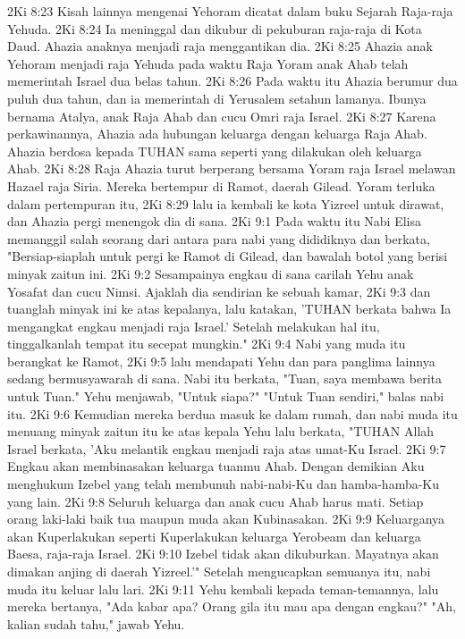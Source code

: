 2Ki 8:23  Kisah lainnya mengenai Yehoram dicatat dalam buku Sejarah Raja-raja Yehuda.
2Ki 8:24  Ia meninggal dan dikubur di pekuburan raja-raja di Kota Daud. Ahazia anaknya menjadi raja menggantikan dia.
2Ki 8:25  Ahazia anak Yehoram menjadi raja Yehuda pada waktu Raja Yoram anak Ahab telah memerintah Israel dua belas tahun.
2Ki 8:26  Pada waktu itu Ahazia berumur dua puluh dua tahun, dan ia memerintah di Yerusalem setahun lamanya. Ibunya bernama Atalya, anak Raja Ahab dan cucu Omri raja Israel.
2Ki 8:27  Karena perkawinannya, Ahazia ada hubungan keluarga dengan keluarga Raja Ahab. Ahazia berdosa kepada TUHAN sama seperti yang dilakukan oleh keluarga Ahab.
2Ki 8:28  Raja Ahazia turut berperang bersama Yoram raja Israel melawan Hazael raja Siria. Mereka bertempur di Ramot, daerah Gilead. Yoram terluka dalam pertempuran itu,
2Ki 8:29  lalu ia kembali ke kota Yizreel untuk dirawat, dan Ahazia pergi menengok dia di sana.
2Ki 9:1  Pada waktu itu Nabi Elisa memanggil salah seorang dari antara para nabi yang dididiknya dan berkata, "Bersiap-siaplah untuk pergi ke Ramot di Gilead, dan bawalah botol yang berisi minyak zaitun ini.
2Ki 9:2  Sesampainya engkau di sana carilah Yehu anak Yosafat dan cucu Nimsi. Ajaklah dia sendirian ke sebuah kamar,
2Ki 9:3  dan tuanglah minyak ini ke atas kepalanya, lalu katakan, 'TUHAN berkata bahwa Ia mengangkat engkau menjadi raja Israel.' Setelah melakukan hal itu, tinggalkanlah tempat itu secepat mungkin."
2Ki 9:4  Nabi yang muda itu berangkat ke Ramot,
2Ki 9:5  lalu mendapati Yehu dan para panglima lainnya sedang bermusyawarah di sana. Nabi itu berkata, "Tuan, saya membawa berita untuk Tuan." Yehu menjawab, "Untuk siapa?" "Untuk Tuan sendiri," balas nabi itu.
2Ki 9:6  Kemudian mereka berdua masuk ke dalam rumah, dan nabi muda itu menuang minyak zaitun itu ke atas kepala Yehu lalu berkata, "TUHAN Allah Israel berkata, 'Aku melantik engkau menjadi raja atas umat-Ku Israel.
2Ki 9:7  Engkau akan membinasakan keluarga tuanmu Ahab. Dengan demikian Aku menghukum Izebel yang telah membunuh nabi-nabi-Ku dan hamba-hamba-Ku yang lain.
2Ki 9:8  Seluruh keluarga dan anak cucu Ahab harus mati. Setiap orang laki-laki baik tua maupun muda akan Kubinasakan.
2Ki 9:9  Keluarganya akan Kuperlakukan seperti Kuperlakukan keluarga Yerobeam dan keluarga Baesa, raja-raja Israel.
2Ki 9:10  Izebel tidak akan dikuburkan. Mayatnya akan dimakan anjing di daerah Yizreel.'" Setelah mengucapkan semuanya itu, nabi muda itu keluar lalu lari.
2Ki 9:11  Yehu kembali kepada teman-temannya, lalu mereka bertanya, "Ada kabar apa? Orang gila itu mau apa dengan engkau?" "Ah, kalian sudah tahu," jawab Yehu.
